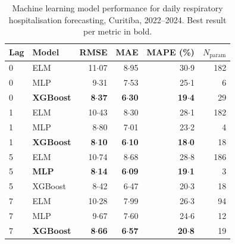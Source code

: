 \documentclass[12pt]{article}
\begin{document}
\begin{table}[ht]
\centering
\caption{Machine learning model performance for daily respiratory
hospitalisation forecasting, Curitiba, 2022--2024. Best result per
metric in bold.}
\label{etab:ml_results}
\begin{tabular}{llrrrr}
\toprule
Lag & Model & RMSE & MAE & MAPE (\%) & $N_\mathrm{param}$ \\
\midrule
0 & ELM     & 11${\cdot}$07 &  8${\cdot}$95 & 30${\cdot}$9 & 182 \\
0 & MLP     &  9${\cdot}$31 &  7${\cdot}$53 & 25${\cdot}$1 &   6 \\
0 & \textbf{XGBoost} & \textbf{8${\cdot}$37} & \textbf{6${\cdot}$30} & \textbf{19${\cdot}$4} &  29 \\
\midrule
1 & ELM     & 10${\cdot}$43 &  8${\cdot}$30 & 28${\cdot}$1 & 182 \\
1 & MLP     &  8${\cdot}$80 &  7${\cdot}$01 & 23${\cdot}$2 &   4 \\
1 & \textbf{XGBoost} & \textbf{8${\cdot}$10} & \textbf{6${\cdot}$10} & \textbf{18${\cdot}$0} &  18 \\
\midrule
5 & ELM     & 10${\cdot}$74 &  8${\cdot}$68 & 28${\cdot}$8 & 186 \\
5 & \textbf{MLP} & \textbf{8${\cdot}$14} & \textbf{6${\cdot}$09} & \textbf{19${\cdot}$1} &   3 \\
5 & XGBoost &  8${\cdot}$42 &  6${\cdot}$47 & 20${\cdot}$3 &  18 \\
\midrule
7 & ELM     & 10${\cdot}$28 &  7${\cdot}$99 & 26${\cdot}$3 &  94 \\
7 & MLP     &  9${\cdot}$67 &  7${\cdot}$60 & 24${\cdot}$6 &  12 \\
7 & \textbf{XGBoost} & \textbf{8${\cdot}$66} & \textbf{6${\cdot}$57} & \textbf{20${\cdot}$8} &  19 \\
\bottomrule
\end{tabular}
\end{table}
\end{document}
